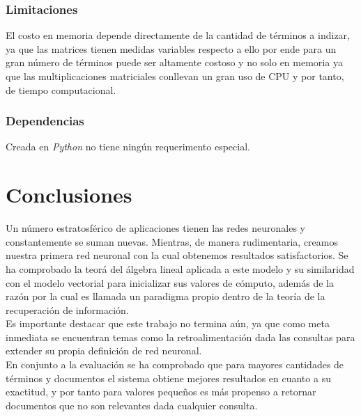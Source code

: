 \documentclass{llncs}
\begin{document}
\subsubsection{Limitaciones}
El costo en memoria depende directamente de la cantidad de t\'erminos a indizar, ya que las matrices tienen medidas variables respecto a ello por ende
para un gran n\'umero de t\'erminos puede ser altamente costoso y no solo en memoria ya que las multiplicaciones matriciales conllevan un gran uso de 
CPU y por tanto, de tiempo computacional.

\subsubsection{Dependencias}

Creada en {\textit{Python}} no tiene ning\'un requerimento especial.

\section{Conclusiones}
Un n\'umero estratosf\'erico de aplicaciones tienen las redes neuronales y constantemente se suman nuevas. Mientras, de manera rudimentaria, creamos
nuestra primera red neuronal con la cual obtenemos resultados satisfactorios. Se ha comprobado la teor\'a del \'algebra lineal aplicada a este modelo y su
similaridad con el modelo vectorial para inicializar sus valores de c\'omputo, adem\'as de la raz\'on por la cual es llamada un paradigma propio dentro de la
teor\'ia de la recuperaci\'on de informaci\'on.\\
Es importante destacar que este trabajo no termina a\'un, ya que como meta inmediata se encuentran temas como la retroalimentaci\'on dada las consultas
para extender su propia definici\'on de red neuronal.\\
En conjunto a la evaluaci\'on se ha comprobado que para mayores cantidades de t\'erminos y documentos el sistema obtiene mejores resultados en cuanto a
su exactitud, y por tanto para valores peque\~nos es m\'as propenso a retornar documentos que no son relevantes dada cualquier consulta.\\
\end{document}
